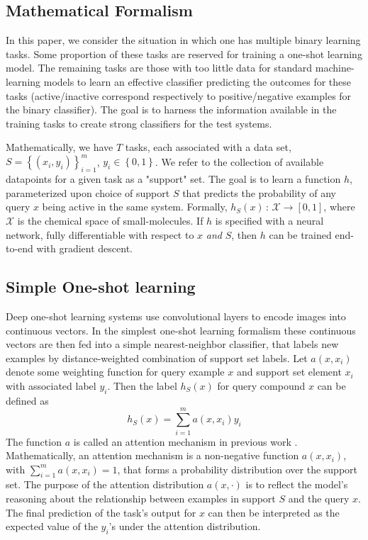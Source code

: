 \documentclass[journal=jacsat,manuscript=article]{achemso}
\begin{document}
\subsection{Mathematical Formalism}

In this paper, we consider the situation in which one has multiple binary learning tasks. Some proportion of these tasks are reserved for training a one-shot learning model. The remaining tasks are those with too little data for standard machine-learning models to learn an effective classifier predicting the outcomes for these tasks (active/inactive correspond respectively to positive/negative examples for the binary classifier). The goal is to harness the information available in the training tasks to create strong classifiers for the test systems. 


Mathematically, we have $T$ tasks, each associated with a data set, $S=\left\{\left(x_i,y_i\right)\right\}_{i=1}^{m}$, $y_i\in\left\{0,1\right\}$. We refer to the collection of available datapoints for a given task as a "support" set. The goal is to learn a function $h$, parameterized upon choice of support $S$ that predicts the probability of any query $x$ being active in the same system. Formally, $h_S(x)\,:\,\mathcal{X}\rightarrow\left[0,1\right]$, where $\mathcal{X}$ is the chemical space of small-molecules. If $h$ is specified with a neural network, fully differentiable with respect to $x$ \emph{and} $S$, then $h$ can be trained end-to-end with gradient descent.



\subsection{Simple One-shot learning}

Deep one-shot learning systems \cite{santoro2016one, vinyals2016matching} use convolutional layers to encode images into continuous vectors. In the simplest one-shot learning formalism these continuous vectors are then fed into a simple nearest-neighbor classifier, that labels new examples by distance-weighted combination of support set labels. Let $a(x, x_i)$ denote some weighting function for query example $x$ and support set element $x_i$ with associated label $y_i$. Then the label $h_S(x)$ for query compound $x$ can be defined as
\[
h_S(x) = \sum\limits_{i=1}^{m}a\left(x,x_i\right)y_i
\]
The function $a$ is called an attention mechanism in previous work \cite{vinyals2016matching}. Mathematically, an attention mechanism is a non-negative function $a(x,x_i)$, with $\sum\nolimits_{i=1}^{m}a(x,x_i)=1$, that forms a probability distribution over the support set. The purpose of the attention distribution $a(x, \cdot)$ is to reflect the model's reasoning about the relationship between examples in support $S$ and the query $x$. The final prediction of the task's output for $x$ can then be interpreted as the expected value of the $y_i$'s under the attention distribution.
\end{document}
